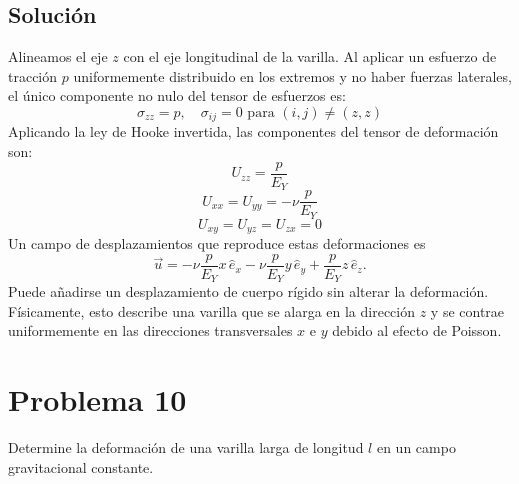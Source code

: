 \documentclass[a4paper]{article}
\begin{document}
\subsection{Solución}
Alineamos el eje $z$ con el eje longitudinal de la varilla. Al aplicar un esfuerzo de tracción $p$ uniformemente distribuido en los extremos y no haber fuerzas laterales, el único componente no nulo del tensor de esfuerzos es:
$$ \sigma_{zz} = p, \quad \sigma_{ij} = 0 \text{ para } (i,j) \neq (z,z) $$
Aplicando la ley de Hooke invertida, las componentes del tensor de deformación son:
$$ U_{zz} = \frac{p}{E_Y} $$
$$ U_{xx} = U_{yy} = -\nu \frac{p}{E_Y} $$
$$ U_{xy} = U_{yz} = U_{zx} = 0 $$
Un campo de desplazamientos que reproduce estas deformaciones es
$$
\vec{u}= -\nu\frac{p}{E_Y}x\,\hat{e}_x
          -\nu\frac{p}{E_Y}y\,\hat{e}_y
          +\frac{p}{E_Y}z\,\hat{e}_z.
$$
Puede añadirse un desplazamiento de cuerpo rígido sin alterar la deformación.
Físicamente, esto describe una varilla que se alarga en la dirección $z$ y se contrae uniformemente en las direcciones transversales $x$ e $y$ debido al efecto de Poisson.

\section{Problema 10}

Determine la deformación de una varilla larga de longitud $l$ en un campo gravitacional constante.
\end{document}
